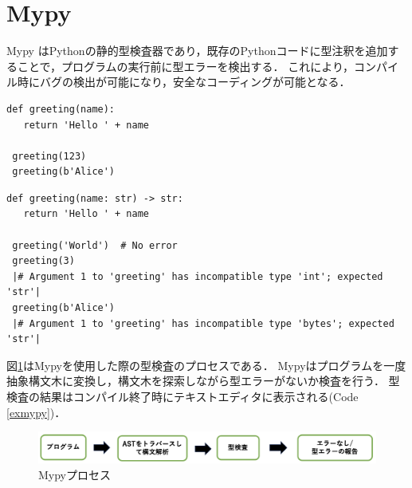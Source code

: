 \documentclass{thesis}
\begin{document}
\newpage
\section{Mypy}
Mypy \cite{Mypy}はPythonの静的型検査器であり，既存のPythonコードに型注釈を追加することで，プログラムの実行前に型エラーを検出する．
これにより，コンパイル時にバグの検出が可能になり，安全なコーディングが可能となる．
\begin{lstlisting}[caption=型注釈のないPythonコード,numbers=none]
 def greeting(name):
   return 'Hello ' + name
 
 greeting(123)
 greeting(b'Alice')
\end{lstlisting}
\begin{lstlisting}[caption=型注釈のあるPythonコード,label=exmypy,numbers=none]
 def greeting(name: str) -> str:
   return 'Hello ' + name
 
 greeting('World')  # No error
 greeting(3)         
 |# Argument 1 to 'greeting' has incompatible type 'int'; expected 'str'|
 greeting(b'Alice')  
 |# Argument 1 to 'greeting' has incompatible type 'bytes'; expected 'str'|
\end{lstlisting}
図\ref{mypyproc}はMypyを使用した際の型検査のプロセスである．
Mypyはプログラムを一度抽象構文木に変換し，構文木を探索しながら型エラーがないか検査を行う．
型検査の結果はコンパイル終了時にテキストエディタに表示される(Code \ref{exmypy})．
\begin{figure}[H]
  \centering
  \includegraphics[scale=0.6]{image/mypyprocess.png}
  \caption{Mypyプロセス}
  \label{mypyproc}
\end{figure}
\end{document}
